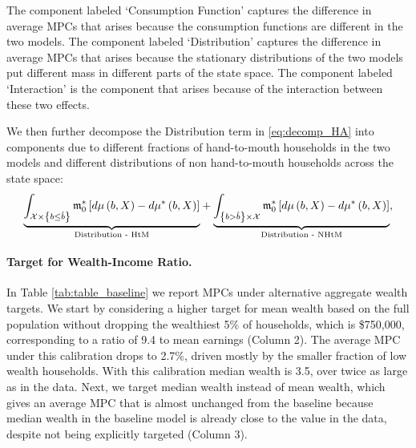 The component labeled `Consumption Function' captures the difference in average MPCs that arises because the consumption functions are different in the two models. The component labeled `Distribution' captures the difference in average MPCs  that arises because the stationary distributions of the two models put different mass in different parts of the state space. The component labeled `Interaction' is the component that arises because of the interaction between these two effects.

We then further decompose the Distribution term in \eqref{eq:decomp_HA} into components due to different fractions of hand-to-mouth households in the two models and different distributions of non hand-to-mouth households across the state space:
\begin{equation*}
\underset{\text{Distribution - HtM}}{\underbrace{\int_{\mathcal{X} \times 
\left\{b\leq \hat{b} \right\} }\mathfrak{m}_{0}^{\ast}\left[ d\mu \left( b,X\right) -d\mu ^{\ast}\left( b,X\right) \right] }}+\underset{\text{Distribution - NHtM}}{%
\underbrace{\int_{\left\{ b>\hat{b}\right\} \times \mathcal{X}}\mathfrak{m}%
_{0}^{\ast}\left[ d\mu \left( b,X\right) -d\mu ^{\ast}\left( b,X\right) %
\right] }},
\end{equation*}

\paragraph{Target for Wealth-Income Ratio.}

In Table \ref{tab:table_baseline} we report MPCs under alternative aggregate wealth targets. We start by considering a higher target for mean wealth based on the full population without dropping the wealthiest 5\% of households, which is \$750,000, corresponding to a ratio of 9.4 to mean earnings (Column 2). The average MPC under this calibration drops to 2.7\%, driven mostly by the smaller fraction of low wealth households. With this calibration median wealth is 3.5, over twice as large as in the data. Next, we target median wealth instead of mean wealth, which gives an average MPC that is almost unchanged from the baseline because median wealth in the baseline model is already close to the value in the data, despite not being explicitly targeted (Column 3). 

